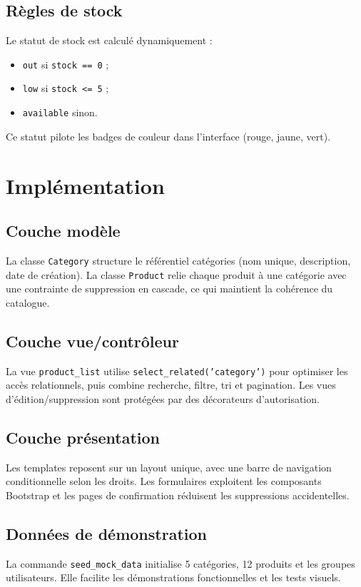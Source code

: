 \documentclass[11pt,a4paper]{article}
\begin{document}
\subsection{R\`egles de stock}
Le statut de stock est calcul\'e dynamiquement :
\begin{itemize}[leftmargin=1.2cm]
  \item \texttt{out} si \texttt{stock == 0} ;
  \item \texttt{low} si \texttt{stock <= 5} ;
  \item \texttt{available} sinon.
\end{itemize}
Ce statut pilote les badges de couleur dans l'interface (rouge, jaune, vert).

\section{Impl\'ementation}
\subsection{Couche mod\`ele}
La classe \texttt{Category} structure le r\'ef\'erentiel cat\'egories (nom unique, description, date de cr\'eation). La classe \texttt{Product} relie chaque produit \`a une cat\'egorie avec une contrainte de suppression en cascade, ce qui maintient la coh\'erence du catalogue.

\subsection{Couche vue/contr\^oleur}
La vue \texttt{product\_list} utilise \texttt{select\_related('category')} pour optimiser les acc\`es relationnels, puis combine recherche, filtre, tri et pagination. Les vues d'\'edition/suppression sont prot\'eg\'ees par des d\'ecorateurs d'autorisation.

\subsection{Couche pr\'esentation}
Les templates reposent sur un layout unique, avec une barre de navigation conditionnelle selon les droits. Les formulaires exploitent les composants Bootstrap et les pages de confirmation r\'eduisent les suppressions accidentelles.

\subsection{Donn\'ees de d\'emonstration}
La commande \texttt{seed\_mock\_data} initialise 5 cat\'egories, 12 produits et les groupes utilisateurs. Elle facilite les d\'emonstrations fonctionnelles et les tests visuels.
\end{document}
